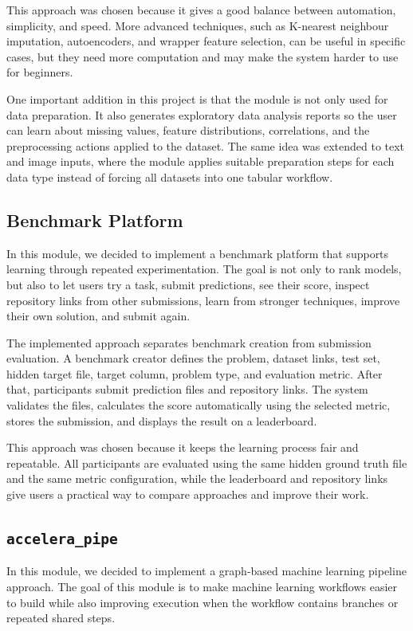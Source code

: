 \documentclass[12pt,a4paper]{report}
\begin{document}
\noindent This approach was chosen because it gives a good balance between automation,
simplicity, and speed. More advanced techniques, such as K-nearest neighbour
imputation, autoencoders, and wrapper feature selection, can be useful in
specific cases, but they need more computation and may make the system harder to
use for beginners.

\noindent One important addition in this project is that the module is not only used for
data preparation. It also generates exploratory data analysis reports so the
user can learn about missing values, feature distributions, correlations, and
the preprocessing actions applied to the dataset. The same idea was extended to
text and image inputs, where the module applies suitable preparation steps for
each data type instead of forcing all datasets into one tabular workflow.

\subsection{Benchmark Platform}
In this module, we decided to implement a benchmark platform that supports
learning through repeated experimentation. The goal is not only to rank models,
but also to let users try a task, submit predictions, see their score, inspect
repository links from other submissions, learn from stronger techniques, improve
their own solution, and submit again.

\noindent The implemented approach separates benchmark creation from submission
evaluation. A benchmark creator defines the problem, dataset links, test set,
hidden target file, target column, problem type, and evaluation metric. After
that, participants submit prediction files and repository links. The system
validates the files, calculates the score automatically using the selected
metric, stores the submission, and displays the result on a leaderboard.

\noindent This approach was chosen because it keeps the learning process fair and
repeatable. All participants are evaluated using the same hidden ground truth
file and the same metric configuration, while the leaderboard and repository
links give users a practical way to compare approaches and improve their work.

\subsection{\texttt{accelera\_pipe}}
In this module, we decided to implement a graph-based machine learning pipeline
approach. The goal of this module is to make machine learning workflows easier
to build while also improving execution when the workflow contains branches or
repeated shared steps.
\end{document}
